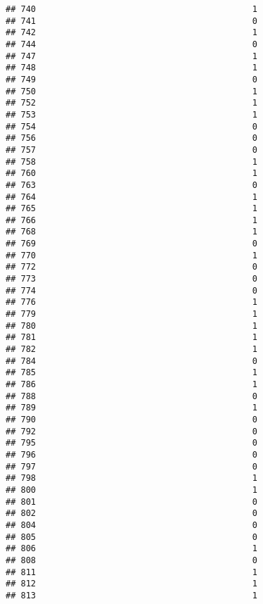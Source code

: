 \documentclass[
]{article}
\begin{document}
\begin{verbatim}
## 740                                           1
## 741                                           0
## 742                                           1
## 744                                           0
## 747                                           1
## 748                                           1
## 749                                           0
## 750                                           1
## 752                                           1
## 753                                           1
## 754                                           0
## 756                                           0
## 757                                           0
## 758                                           1
## 760                                           1
## 763                                           0
## 764                                           1
## 765                                           1
## 766                                           1
## 768                                           1
## 769                                           0
## 770                                           1
## 772                                           0
## 773                                           0
## 774                                           0
## 776                                           1
## 779                                           1
## 780                                           1
## 781                                           1
## 782                                           1
## 784                                           0
## 785                                           1
## 786                                           1
## 788                                           0
## 789                                           1
## 790                                           0
## 792                                           0
## 795                                           0
## 796                                           0
## 797                                           0
## 798                                           1
## 800                                           1
## 801                                           0
## 802                                           0
## 804                                           0
## 805                                           0
## 806                                           1
## 808                                           0
## 811                                           1
## 812                                           1
## 813                                           1

\end{verbatim}
\end{document}
